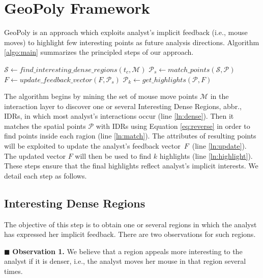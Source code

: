 \newpage
\section{GeoPoly Framework}
\label{sec:algo}
{\sc GeoPoly} is an approach which exploits analyst's implicit feedback (i.e., mouse moves) to highlight few interesting points as future analysis directions. Algorithm \ref{algo:main} summarizes the principled steps of our approach.

\begin{algorithm}[t]
\DontPrintSemicolon
{}
$\mathcal{S} \gets \mathit{find\_interesting\_dense\_regions}(t_c,\mathcal{M})$\label{ln:dense}\;
$\mathcal{P}_s \gets \mathit{match\_points}(\mathcal{S}, \mathcal{P})$\label{ln:match}\;
$F \gets \mathit{update\_feedback\_vector}(F, \mathcal{P}_s)$\label{ln:update}\;
$\mathcal{P}_k \gets \mathit{get\_highlights}(\mathcal{P}, F)$\label{ln:highlight}\;
\; 
\caption{{\sc GeoPoly} Algorithm}
\label{algo:main}
\end{algorithm}

\vspace{2pt}
The algorithm begins by mining the set of mouse move points $\mathcal{M}$ in the interaction layer to discover one or several Interesting Dense Regions, abbr., IDRs, in which most analyst's interactions occur (line \ref{ln:dense}). Then it matches the spatial points $\mathcal{P}$ with IDRs using Equation \ref{eq:reverse} in order to find points inside each ragion (line \ref{ln:match}). The attributes of resulting points will be exploited to update the analyst's feedback vector~$F$~(line \ref{ln:update}). The updated vector $F$ will then be used to find $k$ highlights (line \ref{ln:highlight}). These steps ensure that the final highlights reflect analyst's implicit interests. We detail each step as follows.

\subsection{Interesting Dense Regions}
The objective of this step is to obtain one or several regions in which the analyst has expressed her implicit feedback. There are two observations for such regions.

\vspace{2pt}
\noindent $\blacksquare$ {\bf Observation 1.} We believe that a region appeals more interesting to the analyst if it is denser, i.e., the analyst moves her mouse in that region several times.

